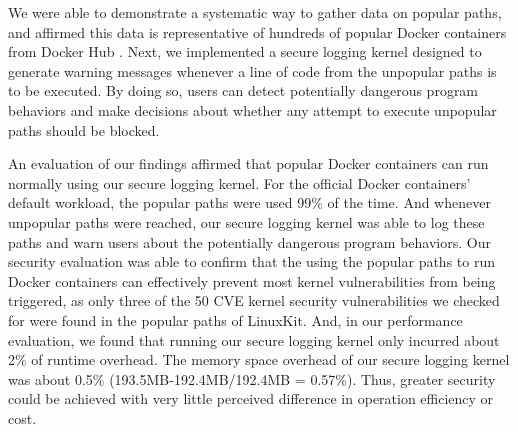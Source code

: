 We were able to demonstrate  a systematic way to gather data on popular paths, 
and affirmed this data is representative of hundreds of popular Docker containers from Docker Hub \cite{DockerHub}. 
Next, we implemented a secure logging kernel designed to generate warning messages whenever a line of code from the unpopular paths is to be executed. 
By doing so, users can detect potentially dangerous program behaviors and make decisions about whether any attempt to execute unpopular paths should be blocked. 

An evaluation of our findings affirmed that popular Docker containers can run normally using our secure logging kernel. 
For the official Docker containers' default workload, the popular paths were used 99\% of the time. 
And whenever unpopular paths were reached, our secure logging kernel was able to log these paths and warn users about the potentially dangerous program behaviors. 
Our security evaluation was able to confirm that the using the popular paths to run Docker containers can effectively 
prevent most kernel vulnerabilities from being triggered, as only three of the 50 CVE kernel security vulnerabilities we checked for were found in the popular paths of LinuxKit. 
And, in our performance evaluation, we found that running our secure logging kernel only incurred about 2\% of runtime overhead. 
The memory space overhead of our secure logging kernel was about 0.5\% (193.5MB-192.4MB/192.4MB = 0.57\%). 
Thus, greater security could be achieved with very little perceived difference in operation efficiency or cost.